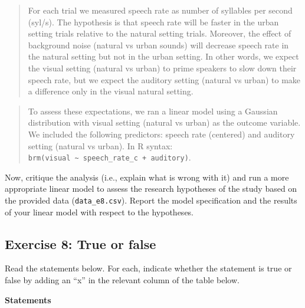 \documentclass[
]{article}
\begin{document}
\begin{quote}
For each trial we measured speech rate as number of syllables per second
(syl/s). The hypothesis is that speech rate will be faster in the urban
setting trials relative to the natural setting trials. Moreover, the
effect of background noise (natural vs urban sounds) will decrease
speech rate in the natural setting but not in the urban setting. In
other words, we expect the visual setting (natural vs urban) to prime
speakers to slow down their speech rate, but we expect the auditory
setting (natural vs urban) to make a difference only in the visual
natural setting.
\end{quote}

\begin{quote}
To assess these expectations, we ran a linear model using a Gaussian
distribution with visual setting (natural vs urban) as the outcome
variable. We included the following predictors: speech rate (centered)
and auditory setting (natural vs urban). In R syntax:
\texttt{brm(visual\ \textasciitilde{}\ speech\_rate\_c\ +\ auditory)}.
\end{quote}

Now, critique the analysis (i.e., explain what is wrong with it) and run
a more appropriate linear model to assess the research hypotheses of the
study based on the provided data (\texttt{data\_e8.csv}). Report the
model specification and the results of your linear model with respect to
the hypotheses.

\newpage

\hypertarget{exercise-8-true-or-false}{%
\subsection{Exercise 8: True or false}\label{exercise-8-true-or-false}}

Read the statements below. For each, indicate whether the statement is
true or false by adding an ``x'' in the relevant column of the table
below.

\textbf{Statements}
\end{document}
